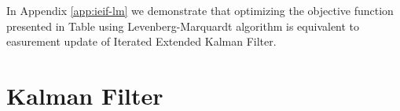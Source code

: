 \documentclass[10pt,twocolumn,letterpaper]{article}
\begin{document}
\begin{table}[!h] 
\centering
\caption{Objective function of IEKF \label{tab:lm}} 
\end{table}

In Appendix \ref{app:ieif-lm} we demonstrate that optimizing the objective function presented in Table \label{tab:lm} using Levenberg-Marquardt algorithm is equivalent to easurement update of Iterated Extended Kalman Filter.


\newpage
\appendix

\section{Kalman Filter} \label{app:kalman}
\end{document}
